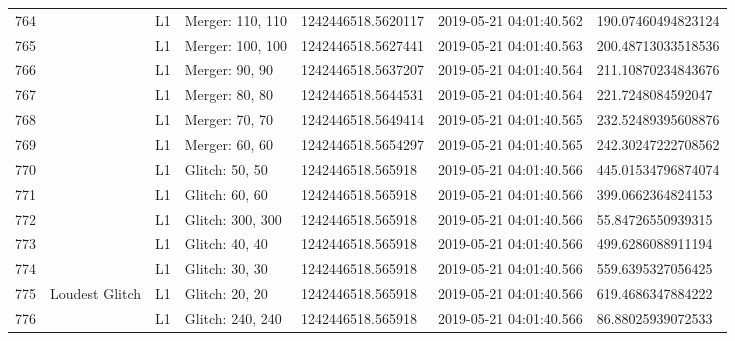 \begin{longtable}{lllllll}
764  &                                                    &       L1 &  Merger: 110, 110 &  1242446518.5620117 &  2019-05-21 04:01:40.562 &  190.07460494823124 \\
765  &                                                    &       L1 &  Merger: 100, 100 &  1242446518.5627441 &  2019-05-21 04:01:40.563 &  200.48713033518536 \\
766  &                                                    &       L1 &    Merger: 90, 90 &  1242446518.5637207 &  2019-05-21 04:01:40.564 &  211.10870234843676 \\
767  &                                                    &       L1 &    Merger: 80, 80 &  1242446518.5644531 &  2019-05-21 04:01:40.564 &   221.7248084592047 \\
768  &                                                    &       L1 &    Merger: 70, 70 &  1242446518.5649414 &  2019-05-21 04:01:40.565 &  232.52489395608876 \\
769  &                                                    &       L1 &    Merger: 60, 60 &  1242446518.5654297 &  2019-05-21 04:01:40.565 &  242.30247222708562 \\
770  &                                                    &       L1 &    Glitch: 50, 50 &   1242446518.565918 &  2019-05-21 04:01:40.566 &  445.01534796874074 \\
771  &                                                    &       L1 &    Glitch: 60, 60 &   1242446518.565918 &  2019-05-21 04:01:40.566 &   399.0662364824153 \\
772  &                                                    &       L1 &  Glitch: 300, 300 &   1242446518.565918 &  2019-05-21 04:01:40.566 &   55.84726550939315 \\
773  &                                                    &       L1 &    Glitch: 40, 40 &   1242446518.565918 &  2019-05-21 04:01:40.566 &   499.6286088911194 \\
774  &                                                    &       L1 &    Glitch: 30, 30 &   1242446518.565918 &  2019-05-21 04:01:40.566 &   559.6395327056425 \\
775  &                                     Loudest Glitch &       L1 &    Glitch: 20, 20 &   1242446518.565918 &  2019-05-21 04:01:40.566 &   619.4686347884222 \\
776  &                                                    &       L1 &  Glitch: 240, 240 &   1242446518.565918 &  2019-05-21 04:01:40.566 &   86.88025939072533 \\

\end{longtable}

